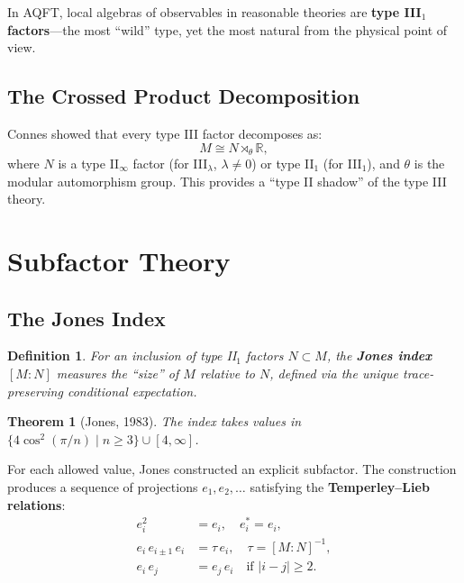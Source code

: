 \documentclass[11pt,a4paper]{article}
\newtheorem{definition}{Definition}[section]
\newtheorem{theorem}{Theorem}[section]
\begin{document}
In AQFT, local algebras of observables in reasonable theories are
\textbf{type III$_1$ factors}---the most ``wild'' type, yet the most
natural from the physical point of view.

\subsection{The Crossed Product Decomposition}

Connes showed that every type III factor decomposes as:
\begin{equation}
  M \cong N \rtimes_\theta \mathbb{R},
\end{equation}
where $N$ is a type II$_\infty$ factor (for III$_\lambda$, $\lambda \neq 0$)
or type II$_1$ (for III$_1$), and $\theta$ is the modular automorphism group.
This provides a ``type II shadow'' of the type III theory.

\section{Subfactor Theory}

\subsection{The Jones Index}

\begin{definition}
For an inclusion of type II$_1$ factors $N \subset M$, the \textbf{Jones index}
$[M : N]$ measures the ``size'' of $M$ relative to $N$, defined via the
unique trace-preserving conditional expectation.
\end{definition}

\begin{theorem}[Jones, 1983]
The index takes values in $\{4\cos^2(\pi/n) \mid n \geq 3\} \cup [4, \infty]$.
\end{theorem}

For each allowed value, Jones constructed an explicit subfactor. The
construction produces a sequence of projections $e_1, e_2, \ldots$ satisfying
the \textbf{Temperley--Lieb relations}:
\begin{align}
  e_i^2 &= e_i, \quad e_i^* = e_i, \\
  e_i\, e_{i\pm 1}\, e_i &= \tau\, e_i, \quad \tau = [M:N]^{-1}, \\
  e_i\, e_j &= e_j\, e_i \quad\text{if } |i-j| \geq 2.
\end{align}
\end{document}
